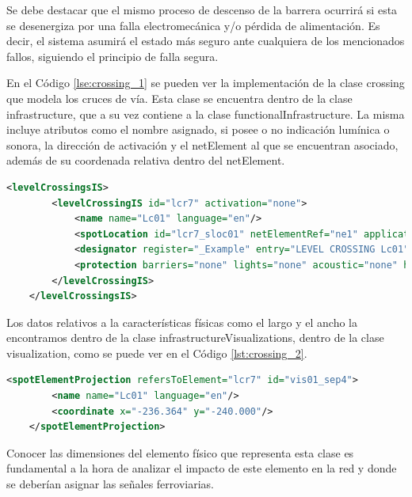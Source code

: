     Se debe destacar que el mismo proceso de descenso de la barrera ocurrirá si esta se desenergiza por una falla electromecánica y/o pérdida de alimentación. Es decir, el sistema asumirá el estado más seguro ante cualquiera de los mencionados fallos, siguiendo el principio de falla segura.

    En el Código \ref{lse:crossing_1} se pueden ver la implementación de la clase crossing que modela los cruces de vía. Esta clase se encuentra dentro de la clase infrastructure, que a su vez contiene a la clase functionalInfrastructure. La misma incluye atributos como el nombre asignado, si posee o no indicación lumínica o sonora, la dirección de activación y el netElement al que se encuentran asociado, además de su coordenada relativa dentro del netElement.

    \begin{lstlisting}[language = XML, caption = Clase Platform , label = {lst:crossing_1}]
    <levelCrossingsIS>
        <levelCrossingIS id="lcr7" activation="none">
            <name name="Lc01" language="en"/>
            <spotLocation id="lcr7_sloc01" netElementRef="ne1" applicationDirection="both" intrinsicCoord="0.3145"/>
            <designator register="_Example" entry="LEVEL CROSSING Lc01"/>
            <protection barriers="none" lights="none" acoustic="none" hasActiveProtection="true"/>
        </levelCrossingIS>
    </levelCrossingsIS>
    \end{lstlisting}

    Los datos relativos a la características físicas como el largo y el ancho la encontramos dentro de la clase infrastructureVisualizations, dentro de la clase visualization, como se puede ver en el Código \ref{lst:crossing_2}.

    \begin{lstlisting}[language = XML, caption = Clase visualization , label = {lst:crossing_2}]
    <spotElementProjection refersToElement="lcr7" id="vis01_sep4">
        <name name="Lc01" language="en"/>
        <coordinate x="-236.364" y="-240.000"/>
    </spotElementProjection>
    \end{lstlisting}

    Conocer las dimensiones del elemento físico que representa esta clase es fundamental a la hora de analizar el impacto de este elemento en la red y donde se deberían asignar las señales ferroviarias.